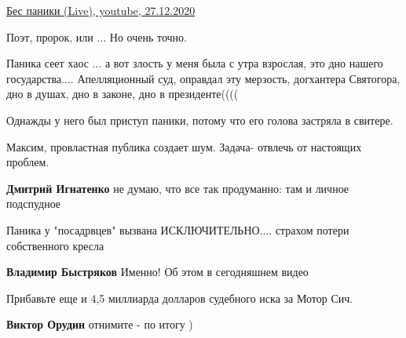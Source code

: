 \begin{itemize}

\href{https://youtu.be/mKCnJNLkmzk}{%
Бес паники (Live), youtube, 27.12.2020%
}

Поэт, пророк, или ...
Но очень точно.


Паника сеет хаос ... а вот злость у меня была с утра взрослая, это дно нашего
государства.... Апелляционный суд, оправдал эту мерзость, догхантера
Святогора, дно в душах, дно в законе, дно в президенте((((

Однажды у него был приступ паники, потому что его голова застряла в свитере.


Максим, провластная публика создает шум. Задача- отвлечь от настоящих проблем.

\textbf{Дмитрий Игнатенко} не думаю, что все так продуманно: там и личное подспудное


Паника у "посадрвцев" вызвана ИСКЛЮЧИТЕЛЬНО.... страхом потери собственного
кресла

\textbf{Владимир Быстряков} Именно! Об этом в сегодняшнем видео

Прибавьте еще и 4,5 миллиарда долларов судебного иска за Мотор Сич.

\textbf{Виктор Орудин} отнимите - по итогу )

\end{itemize} %

